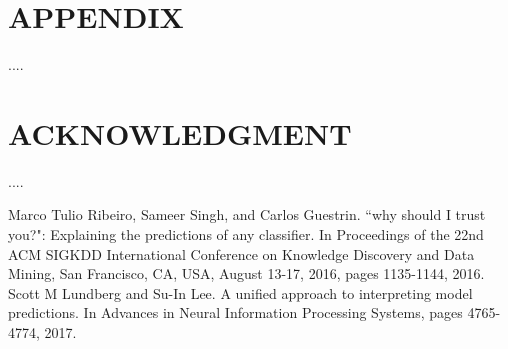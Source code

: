 \documentclass[letterpaper, 10 pt, conference]{ieeeconf}  %
\begin{document}
\addtolength{\textheight}{-12cm}   %







\section*{APPENDIX}

....

\section*{ACKNOWLEDGMENT}

....



\begin{thebibliography}{99}

 Marco Tulio Ribeiro, Sameer Singh, and Carlos Guestrin. ``why should I trust you?": Explaining the predictions of any classifier. In Proceedings of the 22nd ACM SIGKDD International Conference on Knowledge Discovery and Data Mining, San Francisco, CA, USA, August 13-17, 2016, pages 1135-1144, 2016.
 Scott M Lundberg and Su-In Lee. A unified approach to interpreting model predictions. In Advances in Neural Information Processing Systems, pages 4765-4774, 2017.
\end{thebibliography}
\end{document}
